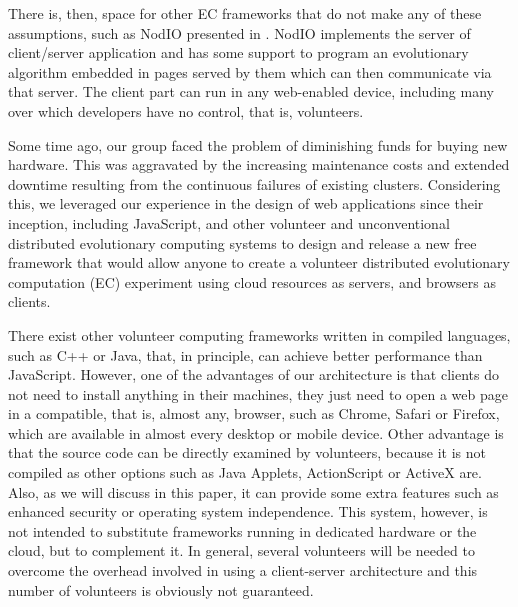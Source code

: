 \documentclass{sig-alternate}
\begin{document}
There is, then, space for other EC frameworks that do not make any of
these assumptions, such as {\sf NodIO} presented in
\cite{2016arXiv160101607Manom}. {\sf NodIO} implements the server of
client/server application and has some support to program an
evolutionary algorithm embedded in pages served by them which can then
communicate via that server. The client part can run in any
web-enabled device, including many over which developers have no
control, that is, volunteers.

Some time ago, our group faced the problem of diminishing funds for
buying new hardware. This was aggravated by the increasing maintenance costs and
extended downtime resulting from the continuous failures of existing
clusters.
Considering this, we leveraged our experience in the design of web
applications since their inception, including JavaScript, and other
volunteer and
unconventional distributed evolutionary computing systems to 
design and release a new free framework that would allow anyone to
create a volunteer distributed evolutionary computation (EC) experiment using cloud resources as
servers, and browsers as clients.

There exist other volunteer computing frameworks written in compiled languages,
such as C++ or Java, that, in principle, can achieve better performance than
JavaScript. However, one of the advantages of our architecture is that
clients do not need to install anything in their machines, they just
need to open a web page  
in a compatible, that is, almost any, browser, such as Chrome, Safari or Firefox, which are
available in almost every desktop or mobile device. Other advantage is
that the source code can be directly examined by volunteers, because it is not
compiled as other options such as Java Applets, ActionScript or
ActiveX are. Also, as we will discuss in this paper, it can provide some extra
features such as enhanced security or operating system
independence. This system, however, is not intended to substitute
frameworks running in dedicated hardware or the cloud, but to
complement it. In general, several volunteers will be needed to
overcome the overhead involved in using a client-server architecture
and this number of volunteers is obviously not guaranteed. 
\end{document}
